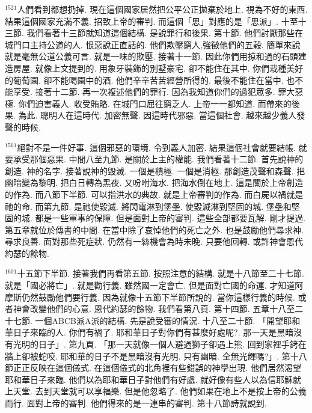\documentclass{book}
\begin{document}
$^{1521}$人們看到都想扔掉.
現在這個國家居然把公平公正拋棄於地上.
視為不好的東西.
結果這個國家充滿不義.
招致上帝的審判.
而這個「思」對應的是「思派」.
十至十三節.
我們看著十三節就知道這個結構.
是說罪行和後果.
第十節.
他們討厭那些在城門口主持公道的人.
恨惡說正直話的.
他們欺壓窮人,強徵他們的五穀.
簡單來說就是毫無公道公義可言.
就是一味的欺壓.
接著十一節.
因此你們用掠和過的石頭建造房屋.
就像上文提到的.
用象牙裝飾的別墅豪宅.
卻不能住在其中.
你們栽種美好的葡萄園.
卻不能喝園中的酒.
他們辛辛苦苦經營所得的.
最後不能住在當中.
也不能享受.
接著十二節.
再一次複述他們的罪行.
因為我知道你們的過犯眾多.
罪大惡極.
你們迫害義人.
收受賄賂.
在城門口屈往窮乏人.
上帝一一都知道.
而帶來的後果.
為此.
聰明人在這時代.
加密無聲.
因這時代邪惡.
當這個社會.
越來越少義人發聲的時候.

$^{1561}$絕對不是一件好事.
這個邪惡的環境.
令到義人加密.
結果這個社會就要結帳.
就要承受那個惡果.
中間八至九節.
是關於上主的權能.
我們看著十二節.
首先說神的創造.
神的名字.
接著說神的毀滅.
一個是積極.
一個是消極.
那創造茂聲和森聲.
把幽暗變為黎明.
把白日轉為黑夜.
又吩咐海水.
把海水倒在地上.
這是關於上帝創造的作為.
而八節下半節.
可以指洪水的典故.
就是上帝審判的作為.
而白屍以禍就是祂的命.
而第九節.
是祂使毀滅.
將閃電淋到堡壘.
使毀滅淋到堅固的城.
堡壘和堅固的城.
都是一些軍事的保障.
但是面對上帝的審判.
這些全部都要瓦解.
剛才提過.
第五章就位於傳書的中間.
在當中除了哀悼他們的死亡之外.
也是鼓勵他們尋求神.
尋求良善.
面對那些死症狀.
仍然有一絲機會為時未晚.
只要他回轉.
或許神會恩代約瑟的餘物.

$^{1601}$十五節下半節.
接著我們再看第五節.
按照注意的結構.
就是十八節至二十七節.
就是「國必將亡」.
就是勸行義.
雖然國一定會亡.
但是面對亡國的命運.
才知道阿摩斯仍然鼓勵他們要行義.
因為就像十五節下半節所說的.
當你這樣行義的時候.
或者神會改變他們的心意.
恩代約瑟的餘物.
我們看第八頁.
第十四節.
五章十八至二十七節.
一個ABCB派A派的結構.
先是說受審的情況.
十八至二十節.
「開望耶和華日子來臨的人.
你們有禍了.
耶和華日子對你們有甚麼好處呢?.
那一天是黑暗沒有光明的日子」.
第九頁.
「那一天就像一個人避過獅子卻遇上熊.
回到家裡手銬在牆上卻被蛇咬.
耶和華的日子不是黑暗沒有光明.
只有幽暗.
全無光輝嗎?」.
第十八節正正反映在這個儀式.
在這個儀式的北角裡有些錯誤的神學出現.
他們居然渴望耶和華日子來臨.
他們以為耶和華日子對他們有好處.
就好像有些人以為信耶穌就上天堂.
去到天堂就可以享福樂.
但是他忽略了.
他們如果在地上不是按上帝的公義而行.
面對上帝的審判.
他們得來的是一連串的審判.
第十八節詩就說到.
\end{document}
